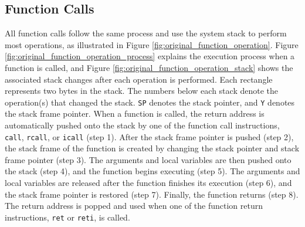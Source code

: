 \subsection{Function Calls}

All function calls follow the same process and use the system stack to perform most operations, as illustrated in Figure \ref{fig:original_function_operation}. Figure \ref{fig:original_function_operation_process} explains the execution process when a function is called, and Figure \ref{fig:original_function_operation_stack} shows the associated stack changes after each operation is performed. Each rectangle represents two bytes in the stack. The numbers below each stack denote the operation(s) that changed the stack. \texttt{SP} denotes the stack pointer, and \texttt{Y} denotes the stack frame pointer. When a function is called, the return address is automatically pushed onto the stack by one of the function call instructions, \texttt{call}, \texttt{rcall}, or \texttt{icall} (step 1). After the stack frame pointer is pushed (step 2), the stack frame of the function is created by changing the stack pointer and stack frame pointer (step 3). The arguments and local variables are then pushed onto the stack (step 4), and the function begins executing (step 5). The arguments and local variables are released after the function finishes its execution (step 6), and the stack frame pointer is restored (step 7). Finally, the function returns (step 8). The return address is popped and used when one of the function return instructions, \texttt{ret} or \texttt{reti}, is called.

